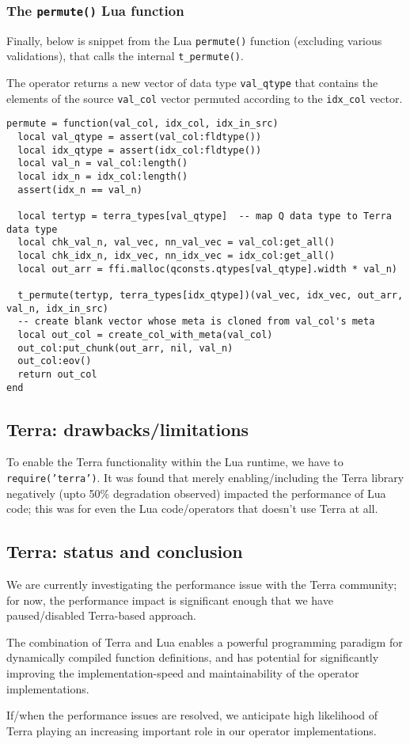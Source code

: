 \subsubsection{The {\tt permute()} Lua function}
Finally, below is snippet from the Lua {\tt permute()} function (excluding various validations), that calls the internal {\tt t\_permute()}.

The operator returns a new vector of data type {\tt val\_qtype} that contains the elements of the source {\tt val\_col} vector permuted according to the {\tt idx\_col} vector.

\begin{verbatim}
permute = function(val_col, idx_col, idx_in_src)
  local val_qtype = assert(val_col:fldtype())
  local idx_qtype = assert(idx_col:fldtype())
  local val_n = val_col:length()
  local idx_n = idx_col:length()
  assert(idx_n == val_n)

  local tertyp = terra_types[val_qtype]  -- map Q data type to Terra data type
  local chk_val_n, val_vec, nn_val_vec = val_col:get_all()
  local chk_idx_n, idx_vec, nn_idx_vec = idx_col:get_all()
  local out_arr = ffi.malloc(qconsts.qtypes[val_qtype].width * val_n)

  t_permute(tertyp, terra_types[idx_qtype])(val_vec, idx_vec, out_arr, val_n, idx_in_src)
  -- create blank vector whose meta is cloned from val_col's meta
  local out_col = create_col_with_meta(val_col)  
  out_col:put_chunk(out_arr, nil, val_n) 
  out_col:eov()
  return out_col
end
\end{verbatim}

\subsection{Terra: drawbacks/limitations}
To enable the Terra functionality within the Lua runtime, we have to {\tt require('terra')}. It was found that merely enabling/including the Terra library negatively (upto 50\% degradation observed) impacted the performance of Lua code; this was for even the Lua code/operators that doesn't use Terra at all.

\subsection{Terra: status and conclusion}
We are currently investigating the performance issue with the Terra community; for now, the performance impact is significant enough that we have paused/disabled Terra-based approach.

The combination of Terra and Lua enables a powerful programming paradigm for dynamically compiled function definitions, and has potential for significantly improving the implementation-speed and maintainability of the operator implementations. 

If/when the performance issues are resolved, we anticipate high likelihood of Terra playing an increasing important role in our operator implementations.